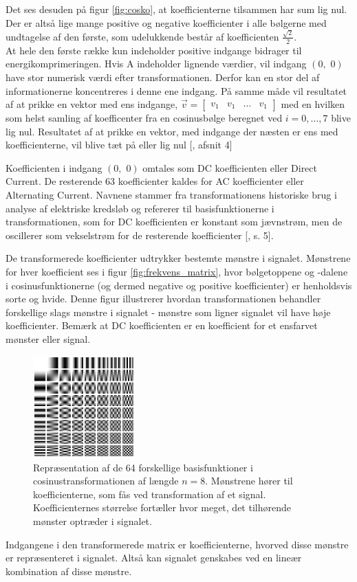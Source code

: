 Det ses desuden på figur \vref{fig:cosko}, at koefficienterne tilsammen har sum lig nul. Der er altså lige mange positive og negative koefficienter i alle bølgerne med undtagelse af den første, som udelukkende består af koefficienten $\frac{\sqrt{2}}{2}$.\\
At hele den første række kun indeholder positive indgange bidrager til energikomprimeringen. Hvis A indeholder lignende værdier, vil indgang $(0,\phantom{i}0)$ have stor numerisk værdi efter transformationen. Derfor kan en stor del af informationerne koncentreres i denne ene indgang. På samme måde vil resultatet af at prikke en vektor med ens indgange, $\vec{v}= \begin{bmatrix} v_1 & v_1 & \hdots & v_1 \end{bmatrix}$ med en hvilken som helst samling af koefficenter fra en cosinusbølge beregnet ved $i=0,\ldots,7$ blive lig nul. Resultatet af at prikke en vektor, med indgange der næsten er ens med koefficienterne, vil blive tæt på eller lig nul [\citet{whydomath_dct}, afsnit 4]

Koefficienten i indgang $(0,\phantom{i}0)$ omtales som DC koefficienten eller Direct Current. De resterende 63 koefficienter kaldes for AC koefficienter eller Alternating Current. Navnene stammer fra transformationens historiske brug i analyse af elektriske kredsløb og refererer til basisfunktionerne i transformationen, som for DC koefficienten er konstant som jævnstrøm, men de oscillerer som vekselstrøm for de resterende koefficienter [\citet{lokminglui_DCT}, s. 5].

De transformerede koefficienter udtrykker bestemte mønstre i signalet. Mønstrene for hver koefficient ses i figur \vref{fig:frekvens_matrix}, hvor bølgetoppene og -dalene i cosinusfunktionerne (og dermed negative og positive koefficienter) er henholdsvis sorte og hvide. Denne figur illustrerer hvordan transformationen behandler forskellige slags mønstre i signalet - mønstre som ligner signalet vil have høje koefficienter. Bemærk at DC koefficienten er en koefficient for et ensfarvet mønster eller signal.
\begin{figure}[htbp]
\centering
\includegraphics[width=0.35\textwidth]{billeder/frekvensmatrix.png}
\caption{Repræsentation af de 64 forskellige basisfunktioner i cosinustransformationen af længde $n = 8$. Mønstrene hører til koefficienterne, som fås ved transformation af et signal. Koefficienternes størrelse fortæller hvor meget, det tilhørende mønster optræder i signalet.}
\label{fig:frekvens_matrix}
\end{figure}
Indgangene i den transformerede matrix er koefficienterne, hvorved disse mønstre er repræsenteret i signalet. Altså kan signalet genskabes ved en lineær kombination af disse mønstre.

